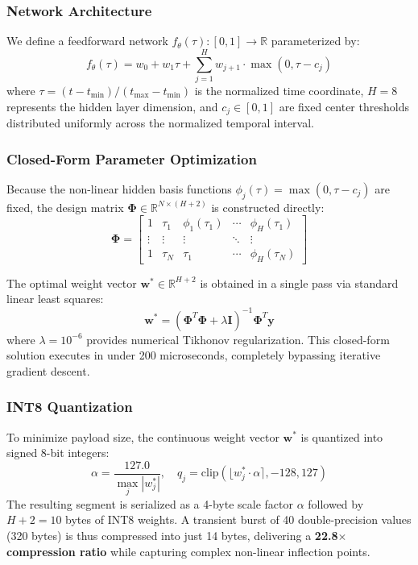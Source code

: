 \documentclass[journal]{IEEEtran}
\begin{document}
\subsubsection{Network Architecture}
We define a feedforward network $f_\theta(\tau): [0, 1] \to \mathbb{R}$ parameterized by:
\begin{equation}
f_\theta(\tau) = w_0 + w_1 \tau + \sum_{j=1}^H w_{j+1} \cdot \max(0, \tau - c_j)
\end{equation}
where $\tau = (t - t_{\min}) / (t_{\max} - t_{\min})$ is the normalized time coordinate, $H = 8$ represents the hidden layer dimension, and $c_j \in [0, 1]$ are fixed center thresholds distributed uniformly across the normalized temporal interval.

\subsubsection{Closed-Form Parameter Optimization}
Because the non-linear hidden basis functions $\phi_j(\tau) = \max(0, \tau - c_j)$ are fixed, the design matrix $\mathbf{\Phi} \in \mathbb{R}^{N \times (H+2)}$ is constructed directly:
\begin{equation}
\mathbf{\Phi} = \begin{bmatrix} 
1 & \tau_1 & \phi_1(\tau_1) & \cdots & \phi_H(\tau_1) \\
\vdots & \vdots & \vdots & \ddots & \vdots \\
1 & \tau_N & \tau_1 & \cdots & \phi_H(\tau_N)
\end{bmatrix}
\end{equation}

The optimal weight vector $\mathbf{w}^* \in \mathbb{R}^{H+2}$ is obtained in a single pass via standard linear least squares:
\begin{equation}
\mathbf{w}^* = (\mathbf{\Phi}^T \mathbf{\Phi} + \lambda \mathbf{I})^{-1} \mathbf{\Phi}^T \mathbf{y}
\end{equation}
where $\lambda = 10^{-6}$ provides numerical Tikhonov regularization. This closed-form solution executes in under 200 microseconds, completely bypassing iterative gradient descent.

\subsubsection{INT8 Quantization}
To minimize payload size, the continuous weight vector $\mathbf{w}^*$ is quantized into signed 8-bit integers:
\begin{equation}
\alpha = \frac{127.0}{\max_j |w_j^*|}, \quad q_j = \text{clip}\left( \lfloor w_j^* \cdot \alpha \rceil, -128, 127 \right)
\end{equation}
The resulting segment is serialized as a 4-byte scale factor $\alpha$ followed by $H+2 = 10$ bytes of INT8 weights. A transient burst of 40 double-precision values (320 bytes) is thus compressed into just 14 bytes, delivering a \textbf{22.8$\times$ compression ratio} while capturing complex non-linear inflection points.
\end{document}
